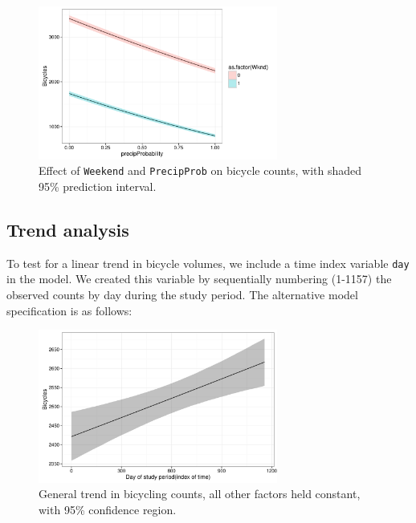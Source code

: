 \documentclass [11pt, proquest] {uwthesis}[2015/03/03]
\begin{document}
\begin{figure}
\centering
   \includegraphics[width=0.7\textwidth]{figures/sim/interact}
  \caption{Effect of \texttt{Weekend} and \texttt{PrecipProb} on bicycle counts, with shaded 95\% prediction interval.}
  \label{fig:interact}
\end{figure}

\subsection{Trend analysis}
To test for a linear trend in bicycle volumes, we include a time index variable \texttt{day} in the model. We created this variable by sequentially numbering (1-1157) the observed counts by day during the study period. The alternative model specification is as follows:

\begin{figure}
\centering
   \includegraphics[width=0.7\textwidth]{figures/sim/trend} 
  \caption{General trend in bicycling counts, all other factors held constant, with 95\% confidence region.}
  \label{fig:trend}
\end{figure}
\end{document}
